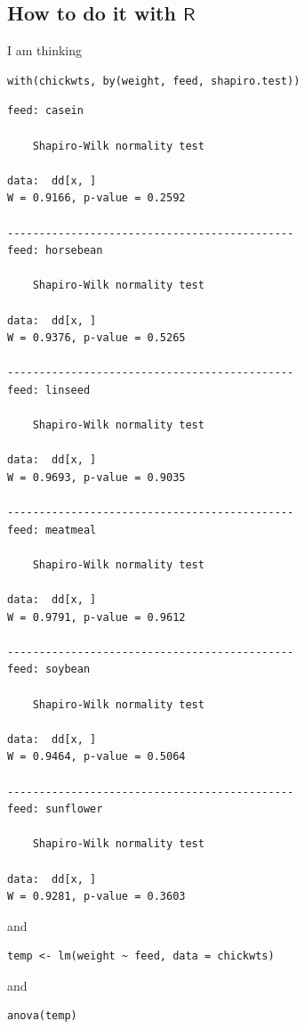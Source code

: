 \documentclass[captions=tableheading]{scrbook}
\begin{document}
\subsection{How to do it with \(\mathsf{R}\)}
\label{sec-10-6-1}


I am thinking 

\lstset{language=R}
\begin{lstlisting}
with(chickwts, by(weight, feed, shapiro.test))
\end{lstlisting}


\begin{verbatim}
feed: casein

	Shapiro-Wilk normality test

data:  dd[x, ] 
W = 0.9166, p-value = 0.2592

--------------------------------------------- 
feed: horsebean

	Shapiro-Wilk normality test

data:  dd[x, ] 
W = 0.9376, p-value = 0.5265

--------------------------------------------- 
feed: linseed

	Shapiro-Wilk normality test

data:  dd[x, ] 
W = 0.9693, p-value = 0.9035

--------------------------------------------- 
feed: meatmeal

	Shapiro-Wilk normality test

data:  dd[x, ] 
W = 0.9791, p-value = 0.9612

--------------------------------------------- 
feed: soybean

	Shapiro-Wilk normality test

data:  dd[x, ] 
W = 0.9464, p-value = 0.5064

--------------------------------------------- 
feed: sunflower

	Shapiro-Wilk normality test

data:  dd[x, ] 
W = 0.9281, p-value = 0.3603
\end{verbatim}

and

\lstset{language=R}
\begin{lstlisting}
temp <- lm(weight ~ feed, data = chickwts)
\end{lstlisting}
and 

\lstset{language=R}
\begin{lstlisting}
anova(temp)
\end{lstlisting}
\end{document}
